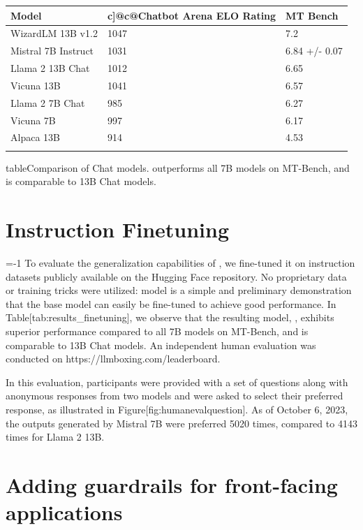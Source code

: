 \documentclass[11pt,a4paper]{article}
\begin{document}
\begin{table}[h]
\begin{tabular}{|l|l|l|}
\hline
Model & c]@c@Chatbot Arena  ELO Rating & MT Bench \\ \hline
WizardLM 13B v1.2 & 1047 & 7.2 \\ \hline
Mistral 7B Instruct & 1031 & 6.84 +/- 0.07 \\ \hline
Llama 2 13B Chat & 1012 & 6.65 \\ \hline
Vicuna 13B & 1041 & 6.57 \\ \hline
Llama 2 7B Chat & 985 & 6.27 \\ \hline
Vicuna 7B & 997 & 6.17 \\ \hline
Alpaca 13B & 914 & 4.53 \\ \hline
 &  &  \\ \hline
\end{tabular}
\end{table}

tableComparison of Chat models. outperforms all 7B models on MT-Bench, and is comparable to 13B Chat models.

\section{Instruction Finetuning}

=-1 To evaluate the generalization capabilities of , we fine-tuned it on instruction datasets publicly available on the Hugging Face repository.
No proprietary data or training tricks were utilized: model is a simple and preliminary demonstration that the base model can easily be fine-tuned to achieve good performance.
In Table[tab:results\_finetuning], we observe that the resulting model, , exhibits superior performance compared to all 7B models on MT-Bench, and is comparable to 13B  Chat models.
An independent human evaluation was conducted on https://llmboxing.com/leaderboard.

In this evaluation, participants were provided with a set of questions along with anonymous responses from two models and were asked to select their preferred response, as illustrated in Figure[fig:humanevalquestion].
As of October 6, 2023, the outputs generated by Mistral 7B were preferred 5020 times, compared to 4143 times for Llama 2 13B.

\section{Adding guardrails for front-facing applications}
\end{document}
